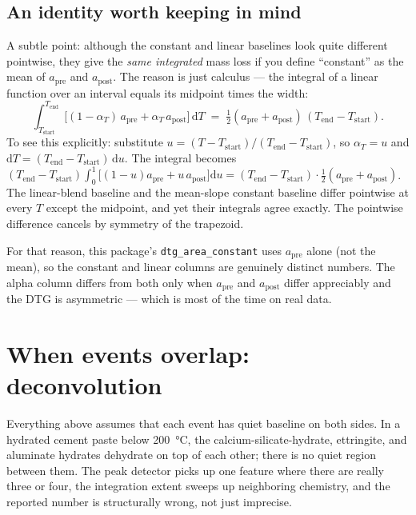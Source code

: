 \documentclass[11pt]{article}
\newcommand{\code}[1]{\texttt{#1}}
\begin{document}
\subsection{An identity worth keeping in mind}

A subtle point: although the constant and linear baselines look quite
different pointwise, they give the \emph{same integrated} mass loss if
you define ``constant'' as the mean of $a_{\mathrm{pre}}$ and
$a_{\mathrm{post}}$. The reason is just calculus --- the integral of a
linear function over an interval equals its midpoint times the width:
\[
  \int_{T_{\mathrm{start}}}^{T_{\mathrm{end}}}
    \bigl[(1-\alpha_T)\,a_{\mathrm{pre}} + \alpha_T\,a_{\mathrm{post}}\bigr]\,
    \mathrm{d}T
  \;=\; \tfrac{1}{2}(a_{\mathrm{pre}} + a_{\mathrm{post}})\,
        (T_{\mathrm{end}} - T_{\mathrm{start}}).
\]
To see this explicitly: substitute $u = (T - T_{\mathrm{start}})/
(T_{\mathrm{end}} - T_{\mathrm{start}})$, so $\alpha_T = u$ and
$\mathrm{d}T = (T_{\mathrm{end}} - T_{\mathrm{start}})\,\mathrm{d}u$.
The integral becomes
$(T_{\mathrm{end}} - T_{\mathrm{start}}) \int_0^1
\bigl[(1-u) a_{\mathrm{pre}} + u\,a_{\mathrm{post}}\bigr]\mathrm{d}u
= (T_{\mathrm{end}} - T_{\mathrm{start}}) \cdot
\tfrac{1}{2}(a_{\mathrm{pre}} + a_{\mathrm{post}})$.
The linear-blend baseline and the mean-slope constant baseline differ
pointwise at every $T$ except the midpoint, and yet their integrals
agree exactly. The pointwise difference cancels by symmetry of the
trapezoid.

For that reason, this package's \code{dtg\_area\_constant} uses
$a_{\mathrm{pre}}$ alone (not the mean), so the constant and linear
columns are genuinely distinct numbers. The alpha column differs from
both only when $a_{\mathrm{pre}}$ and $a_{\mathrm{post}}$ differ
appreciably and the DTG is asymmetric --- which is most of the time
on real data.

\section{When events overlap: deconvolution}

Everything above assumes that each event has quiet baseline on both
sides.  In a hydrated cement paste below \qty{200}{\celsius}, the
calcium-silicate-hydrate, ettringite, and aluminate hydrates dehydrate
on top of each other; there is no quiet region between them. The peak
detector picks up one feature where there are really three or four,
the integration extent sweeps up neighboring chemistry, and the
reported number is structurally wrong, not just imprecise.
\end{document}

